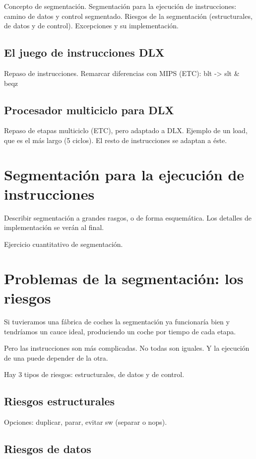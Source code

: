 \documentclass[12pt,onecolumn]{memoir}
\begin{document}
Concepto de segmentación. Segmentación para la ejecución de
instrucciones: camino de datos y control segmentado. Riesgos de la
segmentación (estructurales, de datos y de control). Excepciones y su
implementación.

\subsection{El juego de instrucciones DLX}

Repaso de instrucciones. Remarcar diferencias con MIPS (ETC): blt -> slt \& beqz

\subsection{Procesador multiciclo para DLX}

Repaso de etapas multiciclo (ETC), pero adaptado a DLX. Ejemplo de
un load, que es el más largo (5 ciclos). El resto de instrucciones se adaptan a éste. 

\section{Segmentación para la ejecución de instrucciones}

Describir segmentación a grandes rasgos, o de forma esquemática. Los
detalles de implementación se verán al final.

Ejercicio cuantitativo de segmentación.

\section{Problemas de la segmentación: los riesgos}

Si tuvieramos una fábrica de coches la segmentación ya funcionaría
bien y tendríamos un cauce ideal, produciendo un coche por tiempo de
cada etapa.

Pero las instrucciones son más complicadas. No todas son iguales. Y la
ejecución de una puede depender de la otra.

Hay 3 tipos de riesgos: estructurales, de datos y de control. 

\subsection{Riesgos estructurales}

Opciones: duplicar, parar, evitar sw (separar o nops).

\subsection{Riesgos de datos}
\end{document}
